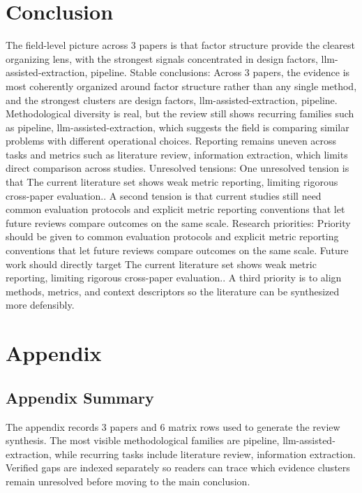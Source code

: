 \documentclass{article}
\begin{document}
\section{Conclusion}
The field-level picture across 3 papers is that factor structure provide the clearest organizing lens, with the strongest signals concentrated in design factors, llm-assisted-extraction, pipeline. Stable conclusions: Across 3 papers, the evidence is most coherently organized around factor structure rather than any single method, and the strongest clusters are design factors, llm-assisted-extraction, pipeline. Methodological diversity is real, but the review still shows recurring families such as pipeline, llm-assisted-extraction, which suggests the field is comparing similar problems with different operational choices. Reporting remains uneven across tasks and metrics such as literature review, information extraction, which limits direct comparison across studies. Unresolved tensions: One unresolved tension is that The current literature set shows weak metric reporting, limiting rigorous cross-paper evaluation.. A second tension is that current studies still need common evaluation protocols and explicit metric reporting conventions that let future reviews compare outcomes on the same scale. Research priorities: Priority should be given to common evaluation protocols and explicit metric reporting conventions that let future reviews compare outcomes on the same scale. Future work should directly target The current literature set shows weak metric reporting, limiting rigorous cross-paper evaluation.. A third priority is to align methods, metrics, and context descriptors so the literature can be synthesized more defensibly. \cite{02_2003_brosseau_trf}

\appendix
\section{Appendix}
\subsection{Appendix Summary}
\noindent The appendix records 3 papers and 6 matrix rows used to generate the review synthesis. The most visible methodological families are pipeline, llm-assisted-extraction, while recurring tasks include literature review, information extraction. Verified gaps are indexed separately so readers can trace which evidence clusters remain unresolved before moving to the main conclusion.
\end{document}
